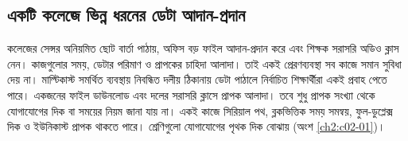\subsection{একটি কলেজে ভিন্ন ধরনের ডেটা আদান-প্রদান}
\label{ch2:c02-14}
কলেজের সেন্সর অনিয়মিত ছোট বার্তা পাঠায়, অফিস বড় ফাইল আদান-প্রদান করে এবং শিক্ষক সরাসরি অডিও ক্লাস নেন। কাজগুলোর সময়, ডেটার পরিমাণ ও প্রাপকের চাহিদা আলাদা। তাই একই প্রেরণব্যবস্থা সব কাজে সমান সুবিধা দেয় না।
মাল্টিকাস্ট সমর্থিত ব্যবস্থায় নিবন্ধিত দলীয় ঠিকানায় ডেটা পাঠালে নির্বাচিত শিক্ষার্থীরা একই প্রবাহ পেতে পারে। একজনের ফাইল ডাউনলোড এবং দলের সরাসরি ক্লাসে প্রাপক আলাদা। তবে শুধু প্রাপক সংখ্যা থেকে যোগাযোগের দিক বা সময়ের নিয়ম জানা যায় না। একই কাজে সিরিয়াল পথ, ব্লকভিত্তিক সময় সমন্বয়, ফুল-ডুপ্লেক্স দিক ও ইউনিকাস্ট প্রাপক থাকতে পারে। শ্রেণিগুলো যোগাযোগের পৃথক দিক বোঝায় (অংশ \ref{ch2:c02-01})।
